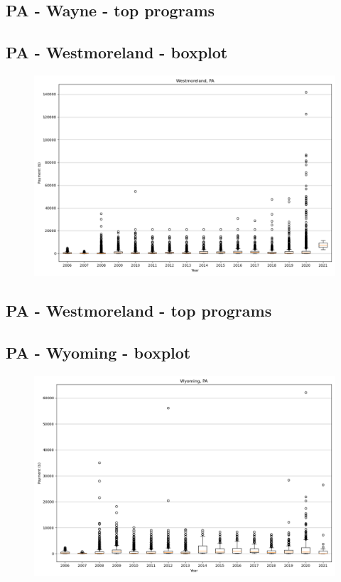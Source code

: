 \subsection*{PA - Wayne - top programs}

\newpage
\subsection*{PA - Westmoreland - boxplot}
\begin{figure}[h]
\centering
\includegraphics[width=7in]{../output/boxplots/counties/Westmoreland-PA_boxplot.png}
\end{figure}


\subsection*{PA - Westmoreland - top programs}

\newpage
\subsection*{PA - Wyoming - boxplot}
\begin{figure}[h]
\centering
\includegraphics[width=7in]{../output/boxplots/counties/Wyoming-PA_boxplot.png}
\end{figure}


